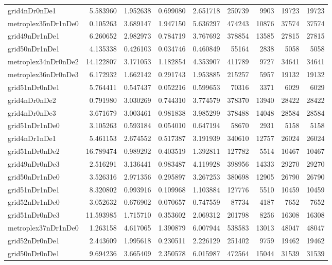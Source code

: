 \begin{longtable}{|l|r|r|r|r|r|r|r|r|}
grid4nDr0nDe1 & 5.583960 & 1.952638 & 0.699080 & 2.651718 & 250739 & 9903 & 19723 & 19723 \\
metroplex35nDr1nDe0 & 0.105263 & 3.689147 & 1.947150 & 5.636297 & 474243 & 10876 & 37574 & 37574 \\
grid49nDr1nDe1 & 6.260652 & 2.982973 & 0.784719 & 3.767692 & 378854 & 13585 & 27815 & 27815 \\
grid50nDr1nDe1 & 4.135338 & 0.426103 & 0.034746 & 0.460849 & 55164 & 2838 & 5058 & 5058 \\
metroplex34nDr0nDe2 & 14.122807 & 3.171053 & 1.182854 & 4.353907 & 411789 & 9727 & 34641 & 34641 \\
metroplex36nDr0nDe3 & 6.172932 & 1.662142 & 0.291743 & 1.953885 & 215257 & 5957 & 19132 & 19132 \\
grid51nDr0nDe1 & 5.764411 & 0.547437 & 0.052216 & 0.599653 & 70316 & 3371 & 6029 & 6029 \\
grid4nDr0nDe2 & 0.791980 & 3.030269 & 0.744310 & 3.774579 & 378370 & 13940 & 28422 & 28422 \\
grid4nDr0nDe3 & 3.671679 & 3.003461 & 0.981838 & 3.985299 & 378488 & 14048 & 28584 & 28584 \\
grid51nDr1nDe0 & 3.105263 & 0.593184 & 0.054010 & 0.647194 & 58670 & 2931 & 5158 & 5158 \\
grid4nDr1nDe1 & 5.461153 & 2.674552 & 0.517387 & 3.191939 & 340610 & 12757 & 26024 & 26024 \\
grid51nDr0nDe2 & 16.789474 & 0.989292 & 0.403519 & 1.392811 & 127782 & 5514 & 10467 & 10467 \\
grid49nDr0nDe3 & 2.516291 & 3.136441 & 0.983487 & 4.119928 & 398956 & 14333 & 29270 & 29270 \\
grid50nDr1nDe0 & 3.526316 & 2.971356 & 0.295897 & 3.267253 & 380698 & 12905 & 26790 & 26790 \\
grid51nDr1nDe1 & 8.320802 & 0.993916 & 0.109968 & 1.103884 & 127776 & 5510 & 10459 & 10459 \\
grid52nDr1nDe0 & 3.052632 & 0.676902 & 0.070657 & 0.747559 & 87734 & 4187 & 7652 & 7652 \\
grid51nDr0nDe3 & 11.593985 & 1.715710 & 0.353602 & 2.069312 & 201798 & 8256 & 16308 & 16308 \\
metroplex37nDr1nDe0 & 1.263158 & 4.617065 & 1.390879 & 6.007944 & 538583 & 13013 & 48047 & 48047 \\
grid52nDr0nDe1 & 2.443609 & 1.995618 & 0.230511 & 2.226129 & 251402 & 9759 & 19462 & 19462 \\
grid50nDr0nDe1 & 9.694236 & 3.665409 & 2.350578 & 6.015987 & 472564 & 15044 & 31539 & 31539 \\

\end{longtable}
